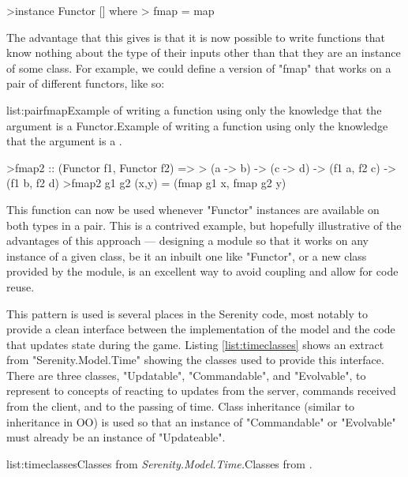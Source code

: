 \begin{haskell}
>instance Functor [] where
>  fmap = map

\end{haskell}
\noindent The advantage that this gives is that it is now possible to write functions that know nothing about the type of their inputs other than that they are an instance of some class. For example, we could define a version of "fmap" that works on a pair of different functors, like so:

\vspace{-0.5em}
\begin{listing}{list:pairfmap}{Example of writing a function using only the knowledge that the argument is a Functor.}{Example of writing a function using only the knowledge that the argument is a .}{}
\end{listing}\vspace{-1.5em}

\begin{haskell}
>fmap2 :: (Functor f1, Functor f2) => 
>  (a -> b) -> (c -> d) -> (f1 a, f2 c) -> (f1 b, f2 d)
>fmap2 g1 g2 (x,y) = (fmap g1 x, fmap g2 y)

\end{haskell}
\noindent This function can now be used whenever "Functor" instances are available on both types in a pair. This is a contrived example, but hopefully illustrative of the advantages of this approach --- designing a module so that it works on any instance of a given class, be it an inbuilt one like "Functor", or a new class provided by the module, is an excellent way to avoid coupling and allow for code reuse.

This pattern is used is several places in the Serenity code, most notably to provide a clean interface between the implementation of the model and the code that updates state during the game. Listing \ref{list:timeclasses} shows an extract from "Serenity.Model.Time" showing the classes used to provide this interface. There are three classes, "Updatable", "Commandable", and "Evolvable", to represent to concepts of reacting to updates from the server, commands received from the client, and to the passing of time. Class inheritance (similar to inheritance in OO) is used so that an instance of "Commandable" or "Evolvable" must already be an instance of "Updateable".

\vspace{-0.5em}
\begin{listing}{list:timeclasses}{Classes from \emph{Serenity.Model.Time.}}{Classes from .}{}
\end{listing}\vspace{-1.5em}

